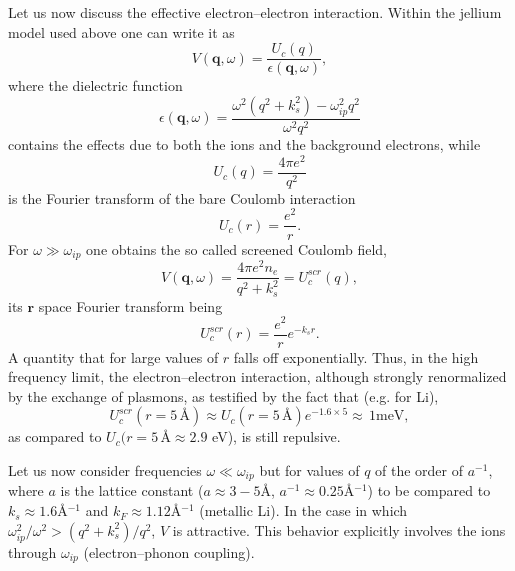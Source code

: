 \begin{subappendices}
Let us now discuss the effective electron--electron interaction. Within the jellium model used above one can write it as
\begin{equation}\label{eqC2AppA14}
V(\mathbf q,\omega)=\frac{U_c(q)}{\epsilon(\mathbf q,\omega)},
\end{equation}
where the dielectric function
\begin{equation}\label{eqC2AppA15}
\epsilon(\mathbf q,\omega)=\frac{\omega^2(q^2+k_s^2)-\omega^2_{ip}q^2}{\omega^2q^2}
\end{equation}
contains the effects due to both the ions and the background electrons, while
\begin{equation}\label{eqC2AppA16}
U_c(q)=\frac{4\pi e^2}{q^2}
\end{equation}
is the Fourier transform of the bare Coulomb interaction
\begin{equation}\label{eqC2AppA17}
U_c(r)=\frac{e^2}{r}.
\end{equation}
For $\omega\gg \omega_{ip}$ one obtains the so called screened Coulomb field,
\begin{equation}\label{eqC2AppA18}
V(\mathbf q,\omega)=\frac{4\pi e^2 n_e}{q^2+k_s^2}=U_c^{scr}(q),
\end{equation}
its $\mathbf r$ space Fourier transform being 
\begin{equation}\label{eqC2AppA19}
U_c^{scr}(r)=\frac{e^2}{r}e^{-k_s r}.
\end{equation}
A quantity that for large values of $r$ falls off exponentially. Thus, in the high frequency limit, the electron--electron interaction, although strongly renormalized by the exchange of plasmons, as testified by the fact that (e.g. for Li),
\begin{equation}\label{eqC2AppA20}
U_c^{scr}(r=5\,\text{\AA})\approx U_c(r=5\,\text{\AA})e^{-1.6\times 5}\approx \,1\text{meV},
\end{equation}
as compared to $U_c(r=5\,\text{\AA}\approx 2.9$ eV), is still repulsive.


Let us now consider frequencies $\omega\ll \omega_{ip}$ but for values of $q$ of the order of $a^{-1}$, where $a$ is the lattice constant ($a\approx 3-5$\AA, $a^{-1}\approx 0.25$\AA$^{-1}$) to be compared to $k_s\approx 1.6 $\AA$^{-1}$ and $k_F\approx 1.12$\AA$^{-1}$ (metallic Li). In the case in which $\omega_{ip}^2/\omega^2>(q^2+k_s^2)/q^2$, $V$ is attractive.  This behavior explicitly involves the ions through $\omega_{ip}$ (electron--phonon coupling). 



\end{subappendices}
